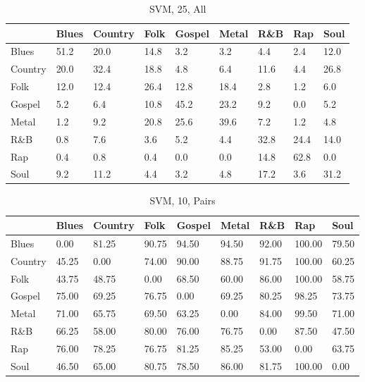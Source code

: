 \documentclass[a4paper,oneside]{article}
\begin{document}
\begin{table}[H]\centering
\caption{SVM, 25, All}
\begin{tabu}{l|*{8}{l}}
 & Blues & Country & Folk & Gospel & Metal & R\&B & Rap & Soul \\ \hline
Blues & 51.2 & 20.0 & 14.8 & 3.2 & 3.2 & 4.4 & 2.4 & 12.0 \\
Country & 20.0 & 32.4 & 18.8 & 4.8 & 6.4 & 11.6 & 4.4 & 26.8 \\
Folk & 12.0 & 12.4 & 26.4 & 12.8 & 18.4 & 2.8 & 1.2 & 6.0 \\
Gospel & 5.2 & 6.4 & 10.8 & 45.2 & 23.2 & 9.2 & 0.0 & 5.2 \\
Metal & 1.2 & 9.2 & 20.8 & 25.6 & 39.6 & 7.2 & 1.2 & 4.8 \\
R\&B & 0.8 & 7.6 & 3.6 & 5.2 & 4.4 & 32.8 & 24.4 & 14.0 \\
Rap & 0.4 & 0.8 & 0.4 & 0.0 & 0.0 & 14.8 & 62.8 & 0.0 \\
Soul & 9.2 & 11.2 & 4.4 & 3.2 & 4.8 & 17.2 & 3.6 & 31.2 \\
\end{tabu}
\end{table}

\begin{table}[H]\centering
\caption{SVM, 10, Pairs}
\begin{tabu}{l|*{8}{l}}
 & Blues & Country & Folk & Gospel & Metal & R\&B & Rap & Soul \\ \hline
Blues & 0.00 & 81.25 & 90.75 & 94.50 & 94.50 & 92.00 & 100.00 & 79.50 \\
Country & 45.25 & 0.00 & 74.00 & 90.00 & 88.75 & 91.75 & 100.00 & 60.25 \\
Folk & 43.75 & 48.75 & 0.00 & 68.50 & 60.00 & 86.00 & 100.00 & 58.75 \\
Gospel & 75.00 & 69.25 & 76.75 & 0.00 & 69.25 & 80.25 & 98.25 & 73.75 \\
Metal & 71.00 & 65.75 & 69.50 & 63.25 & 0.00 & 84.00 & 99.50 & 71.00 \\
R\&B & 66.25 & 58.00 & 80.00 & 76.00 & 76.75 & 0.00 & 87.50 & 47.50 \\
Rap & 76.00 & 78.25 & 76.75 & 81.25 & 85.25 & 53.00 & 0.00 & 63.75 \\
Soul & 46.50 & 65.00 & 80.75 & 78.50 & 86.00 & 81.75 & 100.00 & 0.00
\end{tabu}
\end{table}
\end{document}

